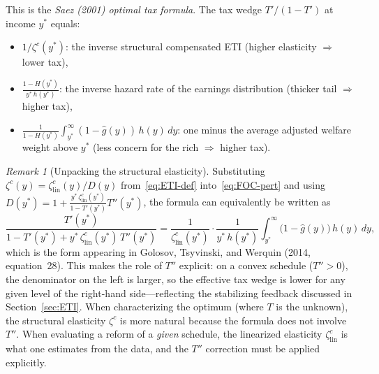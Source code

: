\documentclass[12pt,a4paper]{article}
\theoremstyle{definition}
\theoremstyle{plain}
\theoremstyle{remark}
\newtheorem{remark}{Remark}[section]
\begin{document}
This is the \emph{Saez (2001) optimal tax formula}. The
tax wedge $T'/(1-T')$ at income $y^*$ equals:
\begin{itemize}
  \item $1/\zeta^c(y^*)$: the inverse structural compensated ETI
    (higher elasticity $\Rightarrow$ lower tax),
  \item $\displaystyle\frac{1-H(y^*)}{y^*\,h(y^*)}$: the
    inverse hazard rate of the earnings distribution
    (thicker tail $\Rightarrow$ higher tax),
  \item $\displaystyle\frac{1}{1-H(y^*)}\int_{y^*}^{\infty}
    (1-\hat g(y))\,h(y)\,dy$: one minus the average adjusted
    welfare weight above $y^*$ (less concern for the rich
    $\Rightarrow$ higher tax).
\end{itemize}

\begin{remark}[Unpacking the structural elasticity]
\label{rem:unpack-structural}
Substituting $\zeta^c(y) = \zeta^c_{\mathrm{lin}}(y)/D(y)$ from~\eqref{eq:ETI-def} into~\eqref{eq:FOC-pert} and using $D(y^*) = 1 + \frac{y^*\,\zeta^c_{\mathrm{lin}}(y^*)}{1-T'(y^*)}T''(y^*)$, the formula can equivalently be written as
\[
  \frac{T'(y^*)}{1-T'(y^*) + y^*\,\zeta^c_{\mathrm{lin}}(y^*)\,T''(y^*)}
  = \frac{1}{\zeta^c_{\mathrm{lin}}(y^*)}
  \cdot \frac{1}{y^*\,h(y^*)}
  \int_{y^*}^{\infty}
  \bigl(1-\hat g(y)\bigr)\,h(y)\,dy,
\]
which is the form appearing in Golosov, Tsyvinski, and Werquin (2014, equation~28). This makes the role of $T''$ explicit: on a convex schedule ($T''>0$), the denominator on the left is larger, so the effective tax wedge is lower for any given level of the right-hand side---reflecting the stabilizing feedback discussed in Section~\ref{sec:ETI}. When characterizing the optimum (where $T$ is the unknown), the structural elasticity $\zeta^c$ is more natural because the formula does not involve $T''$. When evaluating a reform of a \emph{given} schedule, the linearized elasticity $\zeta^c_{\mathrm{lin}}$ is what one estimates from the data, and the $T''$ correction must be applied explicitly.
\end{remark}
\end{document}
